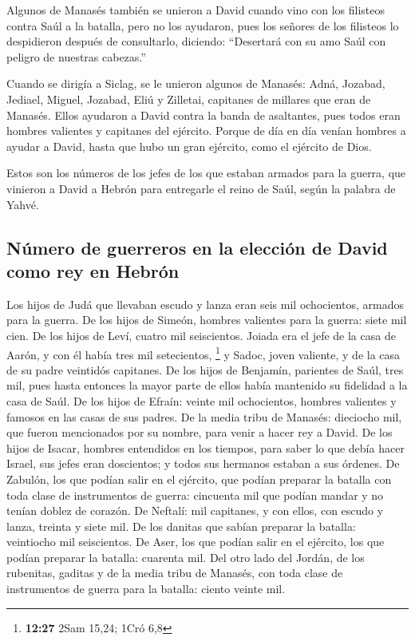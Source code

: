 Algunos de Manasés también se unieron a David cuando
vino con los filisteos contra Saúl a la batalla, pero no los ayudaron,
pues los señores de los filisteos lo despidieron después de consultarlo,
diciendo: ``Desertará con su amo Saúl con peligro de nuestras cabezas.''

 Cuando se dirigía a Siclag, se le unieron algunos de
Manasés: Adná, Jozabad, Jediael, Miguel, Jozabad, Eliú y Zilletai,
capitanes de millares que eran de Manasés.  Ellos
ayudaron a David contra la banda de asaltantes, pues todos eran hombres
valientes y capitanes del ejército.  Porque de día en día
venían hombres a ayudar a David, hasta que hubo un gran ejército, como
el ejército de Dios.

 Estos son los números de los jefes de los que estaban
armados para la guerra, que vinieron a David a Hebrón para entregarle el
reino de Saúl, según la palabra de Yahvé.

\hypertarget{nuxfamero-de-guerreros-en-la-elecciuxf3n-de-david-como-rey-en-hebruxf3n}{%
\subsection{Número de guerreros en la elección de David como rey en
Hebrón}\label{nuxfamero-de-guerreros-en-la-elecciuxf3n-de-david-como-rey-en-hebruxf3n}}

 Los hijos de Judá que llevaban escudo y lanza eran seis
mil ochocientos, armados para la guerra.  De los hijos de
Simeón, hombres valientes para la guerra: siete mil cien.
 De los hijos de Leví, cuatro mil seiscientos.
 Joiada era el jefe de la casa de Aarón, y con él había
tres mil setecientos, \footnote{\textbf{12:27} 2Sam 15,24; 1Cró 6,8}
 y Sadoc, joven valiente, y de la casa de su padre
veintidós capitanes.  De los hijos de Benjamín, parientes
de Saúl, tres mil, pues hasta entonces la mayor parte de ellos había
mantenido su fidelidad a la casa de Saúl.  De los hijos
de Efraín: veinte mil ochocientos, hombres valientes y famosos en las
casas de sus padres.  De la media tribu de Manasés:
dieciocho mil, que fueron mencionados por su nombre, para venir a hacer
rey a David.  De los hijos de Isacar, hombres entendidos
en los tiempos, para saber lo que debía hacer Israel, sus jefes eran
doscientos; y todos sus hermanos estaban a sus órdenes. 
De Zabulón, los que podían salir en el ejército, que podían preparar la
batalla con toda clase de instrumentos de guerra: cincuenta mil que
podían mandar y no tenían doblez de corazón.  De Neftalí:
mil capitanes, y con ellos, con escudo y lanza, treinta y siete mil.
 De los danitas que sabían preparar la batalla:
veintiocho mil seiscientos.  De Aser, los que podían
salir en el ejército, los que podían preparar la batalla: cuarenta mil.
 Del otro lado del Jordán, de los rubenitas, gaditas y de
la media tribu de Manasés, con toda clase de instrumentos de guerra para
la batalla: ciento veinte mil.

